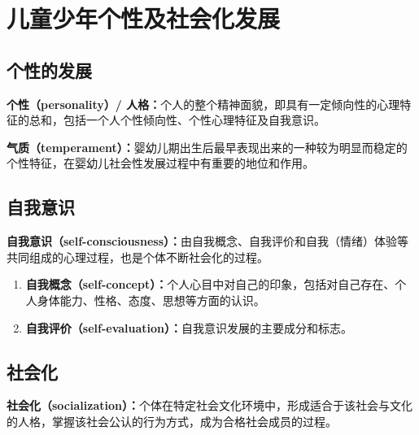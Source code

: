\section{儿童少年个性及社会化发展}

\subsection{个性的发展}

\begin{defbox}
\textbf{个性（personality）/ 人格：}个人的整个精神面貌，即具有一定倾向性的心理特征的总和，包括一个人个性倾向性、个性心理特征及自我意识。

\textbf{气质（temperament）：}婴幼儿期出生后最早表现出来的一种较为明显而稳定的个性特征，在婴幼儿社会性发展过程中有重要的地位和作用。
\end{defbox}

\subsection{自我意识}

\begin{defbox}
\textbf{自我意识（self-consciousness）：}由自我概念、自我评价和自我（情绪）体验等共同组成的心理过程，也是个体不断社会化的过程。

\begin{enumerate}[leftmargin=*]
    \item \textbf{自我概念（self-concept）：}个人心目中对自己的印象，包括对自己存在、个人身体能力、性格、态度、思想等方面的认识。
    \item \textbf{自我评价（self-evaluation）：}自我意识发展的主要成分和标志。
\end{enumerate}
\end{defbox}

\subsection{社会化}

\begin{defbox}
\textbf{社会化（socialization）：}个体在特定社会文化环境中，形成适合于该社会与文化的人格，掌握该社会公认的行为方式，成为合格社会成员的过程。
\end{defbox}

